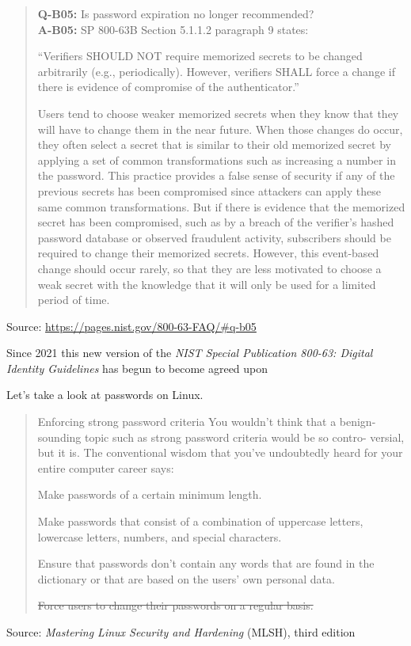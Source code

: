 \documentclass[Screen16to9,17pt]{foils}
\begin{document}


\begin{quote}
{\bf Q-B05:} Is password expiration no longer recommended?\\
{\bf A-B05:} SP 800-63B Section 5.1.1.2 paragraph 9 states:

“Verifiers SHOULD NOT require memorized secrets to be changed arbitrarily (e.g., periodically). However, verifiers SHALL force a change if there is evidence of compromise of the authenticator.”

{\footnotesize Users tend to choose weaker memorized secrets when they know that they will have to change them in the near future. When those changes do occur, they often select a secret that is similar to their old memorized secret by applying a set of common transformations such as increasing a number in the password. This practice provides a false sense of security if any of the previous secrets has been compromised since attackers can apply these same common transformations. But if there is evidence that the memorized secret has been compromised, such as by a breach of the verifier’s hashed password database or observed fraudulent activity, subscribers should be required to change their memorized secrets. However, this event-based change should occur rarely, so that they are less motivated to choose a weak secret with the knowledge that it will only be used for a limited period of time.}
\end{quote}
Source: \url{https://pages.nist.gov/800-63-FAQ/#q-b05}

\begin{list2}
\item Since 2021 this new version of the \emph{NIST Special Publication 800-63: Digital Identity Guidelines} has begun to become agreed upon
\end{list2}




Let's take a look at passwords on Linux.

\begin{quote}
Enforcing strong password criteria
You wouldn’t think that a benign-sounding topic such as strong password criteria would be so contro-
versial, but it is. The conventional wisdom that you’ve undoubtedly heard for your entire computer
career says:
\begin{list2}
\item Make passwords of a certain minimum length.
\item Make passwords that consist of a combination of uppercase letters, lowercase letters, numbers,
and special characters.
\item Ensure that passwords don’t contain any words that are found in the dictionary or that are
based on the users’ own personal data.
\item \sout{Force users to change their passwords on a regular basis.}
\end{list2}
\end{quote}
Source: \emph{Mastering Linux Security and Hardening} (MLSH), third edition
\end{document}
